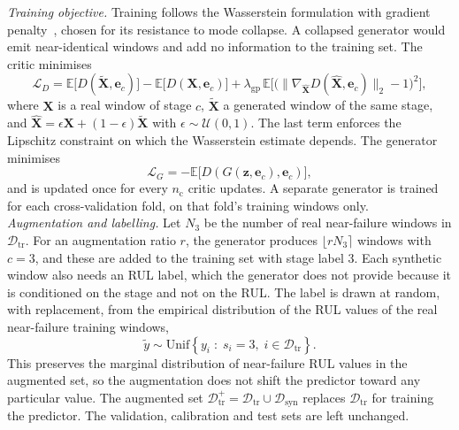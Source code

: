 \textit{Training objective.} Training follows the Wasserstein
formulation with gradient penalty~\cite{NIPS2017_892c3b1c}, chosen for
its resistance to mode collapse. A collapsed generator would emit
near-identical windows and add no information to the training set.
The critic minimises
\begin{equation}
  \mathcal{L}_{D} =
  \mathbb{E}\big[ D(\tilde{\mathbf{X}}, \mathbf{e}_c) \big]
  - \mathbb{E}\big[ D(\mathbf{X}, \mathbf{e}_c) \big]
  + \lambda_{\mathrm{gp}}\,
  \mathbb{E}\Big[ \big( \lVert \nabla_{\hat{\mathbf{X}}}
  D(\hat{\mathbf{X}}, \mathbf{e}_c) \rVert_2 - 1 \big)^2 \Big],
  \label{eq:critic_loss}
\end{equation}
where $\mathbf{X}$ is a real window of stage $c$, $\tilde{\mathbf{X}}$
a generated window of the same stage, and
$\hat{\mathbf{X}} = \epsilon \mathbf{X} + (1-\epsilon)
\tilde{\mathbf{X}}$ with $\epsilon \sim \mathcal{U}(0,1)$. The last
term enforces the Lipschitz constraint on which the Wasserstein
estimate depends. The generator minimises
\begin{equation}
  \mathcal{L}_{G} =
  - \mathbb{E}\big[ D(G(\mathbf{z}, \mathbf{e}_c), \mathbf{e}_c) \big],
  \label{eq:gen_loss}
\end{equation}
and is updated once for every $n_{\mathrm{c}}$ critic updates. A
separate generator is trained for each cross-validation fold, on that
fold's training windows only.\\

\textit{Augmentation and labelling.} Let $N_3$ be the number of real
near-failure windows in $\mathcal{D}_{\mathrm{tr}}$. For an
augmentation ratio $r$, the generator produces
$\lfloor r N_3 \rceil$ windows with $c = 3$, and these are added to the
training set with stage label 3. Each synthetic window also needs an
RUL label, which the generator does not provide because it is
conditioned on the stage and not on the RUL. The label is drawn at
random, with replacement, from the empirical distribution of the RUL
values of the real near-failure training windows,
\begin{equation}
  \tilde{y} \sim \mathrm{Unif}\left\{ y_i \;:\; s_i = 3,\;
  i \in \mathcal{D}_{\mathrm{tr}} \right\}.
  \label{eq:syn_label}
\end{equation}
This preserves the marginal distribution of near-failure RUL values in
the augmented set, so the augmentation does not shift the predictor
toward any particular value. The augmented set
$\mathcal{D}_{\mathrm{tr}}^{+} = \mathcal{D}_{\mathrm{tr}} \cup
\mathcal{D}_{\mathrm{syn}}$ replaces $\mathcal{D}_{\mathrm{tr}}$ for
training the predictor. The validation, calibration and test sets are
left unchanged.

